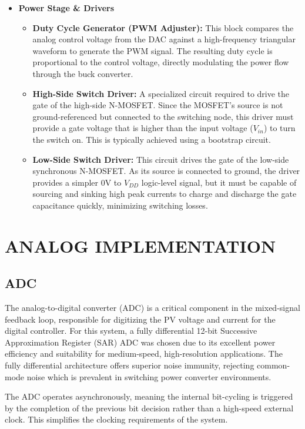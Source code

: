 \documentclass[a4paper,oneside,12pt]{report}
\numberwithin{equation}{chapter}
\begin{document}
\begin{itemize}
    \item \textbf{Power Stage \& Drivers}
    \begin{itemize}
        \item \textbf{Duty Cycle Generator (PWM Adjuster):} This block compares the analog control voltage from the DAC against a high-frequency triangular waveform to generate the PWM signal. The resulting duty cycle is proportional to the control voltage, directly modulating the power flow through the buck converter.
        \item \textbf{High-Side Switch Driver:} A specialized circuit required to drive the gate of the high-side N-MOSFET. Since the MOSFET's source is not ground-referenced but connected to the switching node, this driver must provide a gate voltage that is higher than the input voltage ($V_{in}$) to turn the switch on. This is typically achieved using a bootstrap circuit.
        \item \textbf{Low-Side Switch Driver:} This circuit drives the gate of the low-side synchronous N-MOSFET. As its source is connected to ground, the driver provides a simpler 0V to $V_{DD}$ logic-level signal, but it must be capable of sourcing and sinking high peak currents to charge and discharge the gate capacitance quickly, minimizing switching losses.
    \end{itemize}
\end{itemize}

\chapter{ANALOG IMPLEMENTATION}
\label{chapter:analog_impl}

\section{ADC}
The analog-to-digital converter (ADC) is a critical component in the mixed-signal feedback loop, responsible for digitizing the PV voltage and current for the digital controller. For this system, a fully differential 12-bit Successive Approximation Register (SAR) ADC was chosen due to its excellent power efficiency and suitability for medium-speed, high-resolution applications. The fully differential architecture offers superior noise immunity, rejecting common-mode noise which is prevalent in switching power converter environments.

The ADC operates asynchronously, meaning the internal bit-cycling is triggered by the completion of the previous bit decision rather than a high-speed external clock. This simplifies the clocking requirements of the system.
\end{document}
